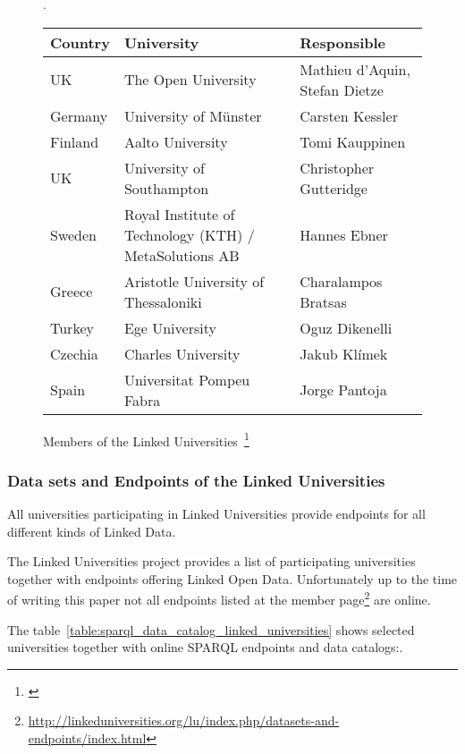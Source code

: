 \begin{figure}[htbp]
\centering
\label{figure:linked-universities-members}.
	\begin{tabular}{| m{1.5cm} | m{6.5cm} | m{4cm} |} \hline
		\textbf{Country} & \textbf{University} & \textbf{Responsible}\\ \hline
    UK & The Open University & Mathieu d'Aquin, Stefan Dietze\\ \hline
    Germany & University of M\"unster & Carsten Kessler\\ \hline
    Finland & Aalto University & Tomi Kauppinen\\ \hline
    UK & University of Southampton & Christopher Gutteridge\\ \hline
    Sweden & Royal Institute of Technology (KTH) / MetaSolutions AB & Hannes Ebner\\ \hline
    Greece & Aristotle University of Thessaloniki & Charalampos Bratsas\\ \hline
    Turkey & Ege University & Oguz Dikenelli\\ \hline
    Czechia & Charles University & Jakub Klímek\\ \hline
    Spain & Universitat Pompeu Fabra & Jorge Pantoja\\ \hline
	\end{tabular}
	\caption[Members of the Linked Universities]{Members of the Linked Universities~\footnote{\citet{url:linked-universities-members}}}
\end{figure}

\subsubsection{Data sets and Endpoints of the Linked Universities}
All universities participating in Linked Universities provide endpoints for all different kinds of Linked Data.

The Linked Universities project provides a list of participating universities together with endpoints offering Linked Open Data. 
Unfortunately up to the time of writing this paper not all endpoints listed at the member page\footnote{\label{LOD_endpoints}\url{http://linkeduniversities.org/lu/index.php/datasets-and-endpoints/index.html}} are online. 

The table~\ref{table:sparql_data_catalog_linked_universities} shows selected universities together with online SPARQL endpoints and data catalogs:.

